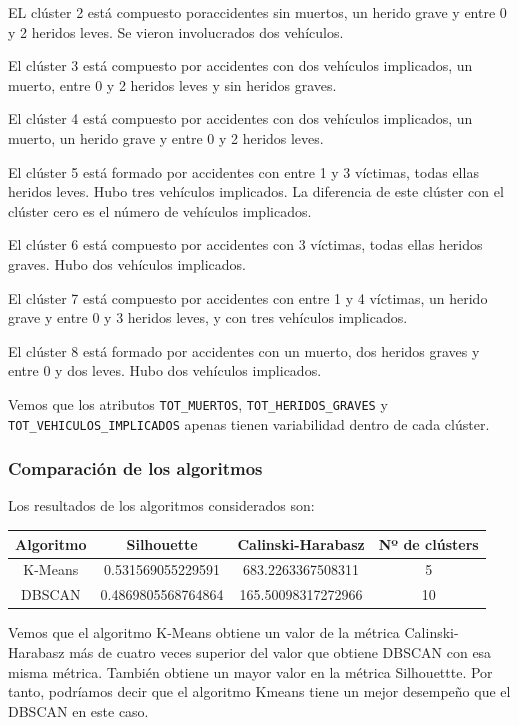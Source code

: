 \documentclass[a4]{article}
\begin{document}
EL clúster 2 está compuesto poraccidentes sin muertos, un herido grave y entre 0 y 2 heridos leves. Se vieron involucrados dos vehículos.

El clúster 3 está compuesto por accidentes con dos vehículos implicados, un muerto, entre 0 y 2 heridos leves y sin heridos graves.

El clúster 4 está compuesto por accidentes con dos vehículos implicados, un muerto, un herido grave y  entre 0 y 2 heridos leves.

El clúster 5 está formado por accidentes con entre 1 y 3 víctimas, todas ellas heridos leves. Hubo tres vehículos implicados. La diferencia de este clúster con el clúster cero es el número de vehículos implicados.

El clúster 6 está compuesto por accidentes con 3 víctimas, todas ellas heridos graves. Hubo dos vehículos implicados.

El clúster 7 está compuesto por accidentes con entre 1 y 4 víctimas, un herido grave y entre 0 y 3 heridos leves, y con tres vehículos implicados.

El clúster 8 está formado por accidentes con un muerto, dos heridos graves y entre 0 y dos leves. Hubo dos vehículos implicados.

Vemos que los atributos \texttt{TOT\_MUERTOS}, \texttt{TOT\_HERIDOS\_GRAVES} y \texttt{TOT\_VEHICULOS\_IMPLICADOS} apenas tienen variabilidad dentro de cada clúster.

\subsubsection{Comparación de los algoritmos}

Los resultados de los algoritmos considerados son:

\begin{center}
\begin{tabular}{|c|c|c|c|}
\hline
  \multicolumn{1}{|c|}{\textbf{Algoritmo}} & \textbf{Silhouette} & \textbf{Calinski-Harabasz} &  \textbf{Nº de clústers}\\ \hline
  K-Means & 0.531569055229591   & 683.2263367508311  & 5  \\ \hline
  DBSCAN  & 0.4869805568764864  & 165.50098317272966 & 10 \\ \hline
\end{tabular}
\end{center}

Vemos que el algoritmo K-Means obtiene un valor de la métrica Calinski-Harabasz más de cuatro veces superior del valor que obtiene DBSCAN con esa misma métrica. También obtiene un mayor valor en la métrica Silhouettte. Por tanto, podríamos decir que el algoritmo Kmeans tiene un mejor desempeño que el DBSCAN en este caso.
\end{document}
